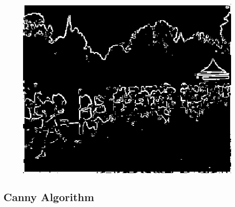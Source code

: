 \documentclass{article}
\begin{document}
\begin{figure}[!h]
		\includegraphics[scale=0.5]{Et100000.png}
	\end{figure}
	\subsection{Canny Algorithm}
\end{document}
